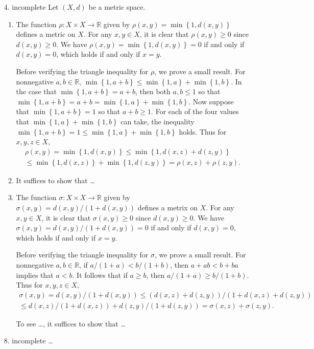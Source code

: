 \documentclass[11pt,leqno]{article}
\theoremstyle{plain}
\theoremstyle{definition}
\numberwithin{equation}{section}
\numberwithin{lem}{section}
\newcommand{\cbr}[1]{\left\{#1\right\}}
\begin{document}
\begin{enumerate}
  \item[4. incomplete] Let $(X,d)$ be a metric space.
  \begin{enumerate}
    \item The function $\rho\colon X\times X\to \mathbb R$ given by $\rho(x,y) = \min\cbr{1,d(x,y)}$ defines a metric on $X$. For any $x,y\in X$, it is clear that $\rho(x,y)\geq 0$ since $d(x,y)\geq 0$. We have $\rho(x,y) = \min\cbr{1,d(x,y)} = 0$ if and only if $d(x,y) = 0$, which holds if and only if $x = y$.
    
    Before verifying the triangle inequality for $\rho$, we prove a small result. For nonnegative $a,b\in\mathbb R$, $\min\cbr{1,a+b}\leq \min\cbr{1,a} + \min\cbr{1,b}$. In the case that $\min\cbr{1,a+b}= a+b$, then both $a,b\leq 1$ so that $\min\cbr{1,a+b} = a+b = \min\cbr{1,a} + \min\cbr{1,b}$. 
    Now suppose that $\min\cbr{1,a+b}= 1$ so that $a+b\geq 1$.
    For each of the four values that $\min\cbr{1,a} + \min\cbr{1,b}$ can take, the inequality $\min\cbr{1,a+b}= 1\leq \min\cbr{1,a} + \min\cbr{1,b}$ holds. Thus for $x,y,z\in X$, \begin{multline*}
      \rho(x,y) = \min\cbr{1,d(x,y)}\leq \min\cbr{1,d(x,z) + d(z,y)}\\\leq \min\cbr{1,d(x,z)} + \min\cbr{1,d(z,y)} = \rho(x,z) + \rho(z,y).
    \end{multline*}

    \item It suffices to show that \dots
    \item The function $\sigma\colon X\times X\to \mathbb R$ given by $\sigma(x,y) = d(x,y)/(1+d(x,y))$ defines a metrix on $X$. For any $x,y\in X$, it is clear that $\sigma(x,y) \geq 0$ since $d(x,y)\geq 0$. We have $\sigma(x,y) = d(x,y)/(1+d(x,y)) = 0$ if and only if $d(x,y) = 0$, which holds if and only if $x=y$.
    
    Before verifying the triangle inequality for $\sigma$, we prove a small result. For nonnegative $a,b\in \mathbb R$, if $a/(1+a)< b/(1+b)$, then $a+ ab < b + ba$ implies that $a<b$. It follows that if $a\geq b$, then $a/(1+a)\geq b/(1+b)$. Thus for $x,y,z\in X$, \begin{multline*}
      \sigma(x,y) = d(x,y)/(1+d(x,y)) \leq (d(x,z) + d(z,y))/(1+ d(x,z) + d(z,y))\\ \leq d(x,z)/(1+ d(x,z)) + d(z,y)/(1+d(z,y)) = \sigma(x,z) + \sigma(z,y).
    \end{multline*}

    To see \dots, it suffices to show that \dots
  \end{enumerate}
  
  \item[8. incomplete] \dots
\end{enumerate}
\end{document}
